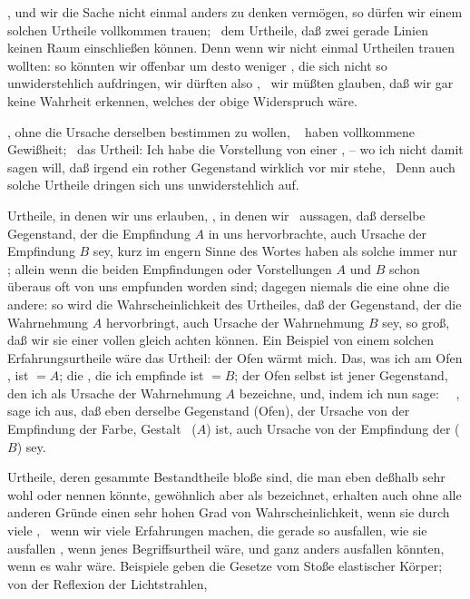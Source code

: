 \begin{aufza}
\item {}, und wir die Sache nicht einmal anders zu denken vermögen, so dürfen wir einem solchen Urtheile vollkommen trauen; \zB\ dem Urtheile, daß zwei gerade Linien keinen Raum einschließen können. Denn wenn wir nicht einmal  Urtheilen trauen wollten: so könnten wir offenbar um desto weniger , die sich nicht so unwiderstehlich aufdringen, wir dürften also , \dh\ wir müßten glauben, daß wir gar keine Wahrheit erkennen, welches der obige Widerspruch wäre.
\item {}, ohne die Ursache derselben bestimmen zu wollen, \dh\  haben vollkommene Gewißheit; \zB\ das Urtheil: Ich habe die Vorstellung von einer , -- wo ich nicht damit sagen will, daß irgend ein rother Gegenstand wirklich vor mir stehe, \udgl\ Denn auch solche Urtheile dringen sich uns unwiderstehlich auf.
\item Urtheile, in denen wir uns erlauben, , in denen wir \zB\ aussagen, daß derselbe Gegenstand, der die Empfindung $A$ in uns hervorbrachte, auch Ursache der Empfindung $B$ sey, kurz  im engern Sinne des Wortes haben als solche immer nur ; allein wenn die beiden Empfindungen oder Vorstellungen $A$ und $B$ schon überaus oft von uns  empfunden worden sind; dagegen niemals die eine ohne die andere: so wird die Wahrscheinlichkeit des Urtheiles, daß der Gegenstand, der die Wahrnehmung $A$ hervorbringt, auch Ursache der Wahrnehmung $B$ sey, so groß, daß wir sie einer vollen  gleich achten können. Ein Beispiel von einem solchen Erfahrungsurtheile wäre das Urtheil: der Ofen wärmt mich. Das, was ich am Ofen , ist $=A$; die , die ich empfinde ist $=B$; der Ofen selbst ist jener Gegenstand, den ich als Ursache der Wahrnehmung $A$ bezeichne, und, indem ich nun sage: ~\ , sage ich aus, daß eben derselbe Gegenstand (Ofen), der Ursache von der Empfindung der Farbe, Gestalt \udgl\ ($A$) ist, auch Ursache von der Empfindung der  ($B$) sey.
\item Urtheile, deren gesammte Bestandtheile bloße  sind, die man eben deßhalb sehr wohl  oder  nennen könnte, gewöhnlich aber als  bezeichnet, erhalten auch ohne alle anderen Gründe einen sehr hohen Grad von Wahrscheinlichkeit, wenn sie durch viele , \dh\ wenn wir viele Erfahrungen machen, die gerade so ausfallen, wie sie ausfallen , wenn jenes Begriffsurtheil  wäre, und ganz anders ausfallen könnten, wenn es  wahr wäre. Beispiele geben die Gesetze vom Stoße elastischer Körper; von der Reflexion der Lichtstrahlen, \udgl\

\end{aufza}
